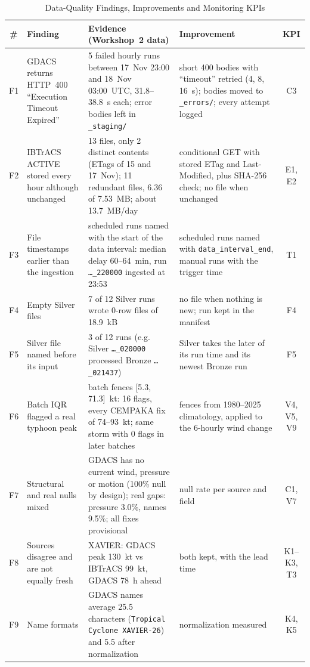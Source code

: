 \documentclass[10pt,twocolumn,letterpaper]{article}
\newcommand{\code}[1]{\texttt{\footnotesize #1}}
\begin{document}
\begin{table}[t]
\caption{Data-Quality Findings, Improvements and Monitoring KPIs}\label{tab:findings}
\centering\footnotesize
\begin{tabularx}{\textwidth}{@{}c L{4.2cm} Y L{4.0cm} c@{}}
\toprule
\# & Finding & Evidence (Workshop~2 data) & Improvement & KPI\\
\midrule
F1 & GDACS returns HTTP~400 ``Execution Timeout Expired'' & 5 failed hourly runs between 17~Nov 23:00 and 18~Nov 03:00~UTC, 31.8--38.8~s each; error bodies left in \code{\_staging/} & short 400 bodies with ``timeout'' retried (4, 8, 16~s); bodies moved to \code{\_errors/}; every attempt logged & C3\\
F2 & IBTrACS ACTIVE stored every hour although unchanged & 13 files, only 2 distinct contents (ETags of 15 and 17~Nov); 11 redundant files, 6.36 of 7.53~MB; about 13.7~MB/day & conditional GET with stored ETag and Last-Modified, plus SHA-256 check; no file when unchanged & E1, E2\\
F3 & File timestamps earlier than the ingestion & scheduled runs named with the start of the data interval: median delay 60--64~min, run \code{\ldots\_220000} ingested at 23:53 & scheduled runs named with \code{data\_interval\_end}, manual runs with the trigger time & T1\\
F4 & Empty Silver files & 7 of 12 Silver runs wrote 0-row files of 18.9~kB & no file when nothing is new; run kept in the manifest & F4\\
F5 & Silver file named before its input & 3 of 12 runs (e.g. Silver \code{\ldots\_020000} processed Bronze \code{\ldots\_021437}) & Silver takes the later of its run time and its newest Bronze run & F5\\
F6 & Batch IQR flagged a real typhoon peak & batch fences [5.3, 71.3]~kt: 16 flags, every CEMPAKA fix of 74--93~kt; same storm with 0 flags in later batches & fences from 1980--2025 climatology, applied to the 6-hourly wind change & V4, V5, V9\\
F7 & Structural and real nulls mixed & GDACS has no current wind, pressure or motion (100\% null by design); real gaps: pressure 3.0\%, names 9.5\%; all fixes provisional & null rate per source and field & C1, V7\\
F8 & Sources disagree and are not equally fresh & XAVIER: GDACS peak 130~kt vs IBTrACS 99~kt, GDACS 78~h ahead & both kept, with the lead time & K1--K3, T3\\
F9 & Name formats & GDACS names average 25.5 characters (\code{Tropical Cyclone XAVIER-26}) and 5.5 after normalization & normalization measured & K4, K5\\
\bottomrule
\end{tabularx}
\end{table}
\end{document}
